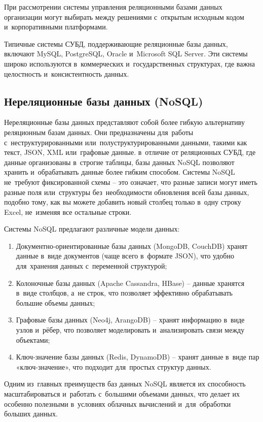 \documentclass{ou}
\begin{document}
При рассмотрении системы управления реляционными базами данных организации могут выбирать между решениями с~открытым исходным кодом и~корпоративными платформами.

Типичные системы СУБД, поддерживающие реляционные базы данных, включают MySQL, PostgreSQL, Oracle и~Microsoft SQL Server. Эти системы широко используются в~коммерческих и~государственных структурах, где важна целостность и~консистентность данных.

\subsection{Нереляционные базы данных (NoSQL)}
Нереляционные базы данных представляют собой более гибкую альтернативу реляционным базам данных. Они предназначены для~работы с~неструктурированными или~полуструктурированными данными, такими как текст, JSON, XML или~графовые данные. в~отличие от реляционных СУБД, где данные организованы в~строгие таблицы, базы данных NoSQL позволяют хранить и~обрабатывать данные более гибким способом. Системы NoSQL не~требуют фиксированной схемы -- это означает, что разные записи могут иметь разные поля или~структуры без~необходимости обновления всей базы данных, подобно тому, как вы можете добавить новый столбец только в~одну строку Excel, не~изменяя все остальные строки.

Системы NoSQL предлагают различные модели данных: 
\begin{enumerate}[itemindent=4em, nosep, label=\arabic*)]
\item Документно-ориентированные базы данных (MongoDB, CouchDB) хранят данные в~виде документов (чаще всего в~формате JSON), что удобно для~хранения данных с~переменной структурой;
\item Колоночные базы данных (Apache Cassandra, HBase) -- данные хранятся в~виде столбцов, а~не строк, что позволяет эффективно обрабатывать большие объемы данных;
\item Графовые базы данных (Neo4j, ArangoDB) -- хранят информацию в~виде узлов и~рёбер, что позволяет моделировать и~анализировать связи между объектами;
\item Ключ-значение базы данных (Redis, DynamoDB) -- хранят данные в~виде пар «ключ-значение», что подходит для~простых структур данных.
\end{enumerate}

Одним из~главных преимуществ баз данных NoSQL является их способность масштабироваться и~работать с~большими объемами данных, что делает их особенно полезными в~условиях облачных вычислений и~для~обработки больших данных.
\end{document}
